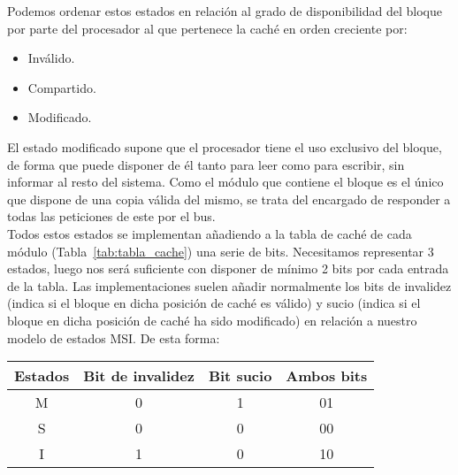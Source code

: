 Podemos ordenar estos estados en relación al grado de disponibilidad del bloque por parte del procesador al que pertenece la caché en orden creciente por:
\begin{itemize}
    \item Inválido.
    \item Compartido.
    \item Modificado.
\end{itemize}
El estado modificado supone que el procesador tiene el uso exclusivo del bloque, de forma que puede disponer de él tanto para leer como para escribir, sin informar al resto del sistema. Como el módulo que contiene el bloque es el único que dispone de una copia válida del mismo, se trata del encargado de responder a todas las peticiones de este por el bus.\\

Todos estos estados se implementan añadiendo a la tabla de caché de cada módulo (Tabla~\ref{tab:tabla_cache}) una serie de bits. Necesitamos representar 3 estados, luego nos será suficiente con disponer de mínimo 2 bits por cada entrada de la tabla. Las implementaciones suelen añadir normalmente los bits de invalidez (indica si el bloque en dicha posición de caché es válido) y sucio (indica si el bloque en dicha posición de caché ha sido modificado) en relación a nuestro modelo de estados MSI\@. De esta forma:
\begin{table}[H]
\centering
\begin{tabular}{c c c c}
    Estados & Bit de invalidez & Bit sucio & Ambos bits \\
    \midrule
    M & 0 & 1 & 01 \\
    S & 0 & 0 & 00 \\
    I & 1 & 0 & 10
\end{tabular}
\end{table}

